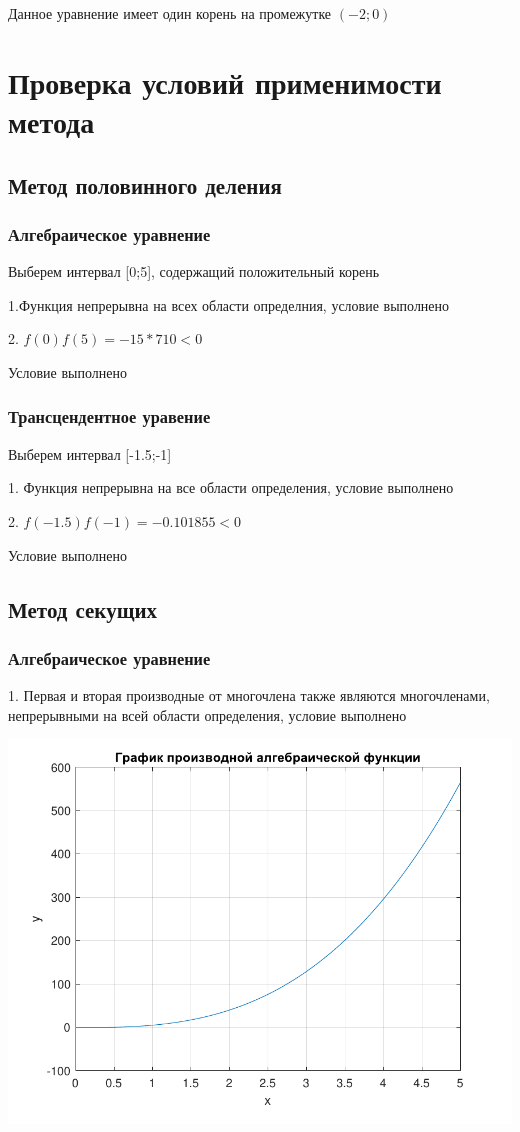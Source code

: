 Данное уравнение имеет один корень на промежутке \begin{math} 
   (-2;0)
\end{math}
\section{Проверка условий применимости метода}
\subsection {Метод половинного деления}
\subsubsection {Алгебраическое уравнение}
Выберем интервал [0;5], содержащий положительный корень

1.Функция непрерывна на всех области определния, условие выполнено

2. \begin{math}
	f(0)f(5)=-15*710<0 
\end{math}

Условие выполнено
\subsubsection {Трансцендентное уравение}
Выберем интервал [-1.5;-1]

1. Функция непрерывна на все области определения, условие выполнено

2. \begin{math}
	f(-1.5)f(-1)=-0.101855<0 
\end{math}

Условие выполнено
\subsection {Метод секущих}
\subsubsection {Алгебраическое уравнение}
1. Первая и вторая производные от многочлена также являются многочленами, непрерывными на всей области определения, условие выполнено

\includegraphics[scale=0.75]{12.pdf}

